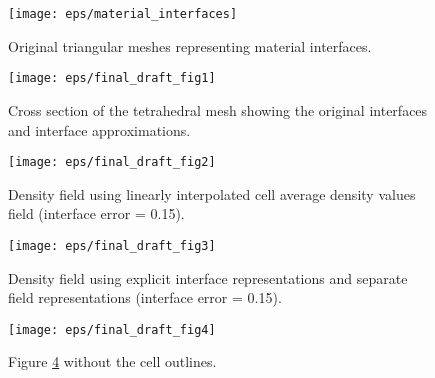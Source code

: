 \documentclass{siggraph}
\begin{document}
\begin{figure}
\begin{center}
\texttt{[image: eps/material\_interfaces]}
\caption{Original triangular meshes representing material interfaces.}
\label{MaterialInterfaces}
\end{center}
\end{figure}


\begin{figure}
\begin{center}
\texttt{[image: eps/final\_draft\_fig1]}
\caption{Cross section of the tetrahedral mesh showing the original interfaces and interface approximations.}
\label{FinalDraftFig1}
\end{center}
\end{figure}


\begin{figure}
\begin{center}
\texttt{[image: eps/final\_draft\_fig2]}
\caption{Density field using linearly interpolated cell average density values field (interface error = 0.15).}
\label{FinalDraftFig2}
\end{center}
\end{figure}


\begin{figure}
\begin{center}
\texttt{[image: eps/final\_draft\_fig3]}
\caption{Density field using explicit interface representations and separate field representations 
(interface error = 0.15).}
\label{FinalDraftFig3}
\end{center}
\end{figure}

\begin{figure}
\begin{center}
\texttt{[image: eps/final\_draft\_fig4]}
\caption{Figure \ref{FinalDraftFig3} without the cell outlines.}
\label{FinalDraftFig4}
\end{center}
\end{figure}
\end{document}
